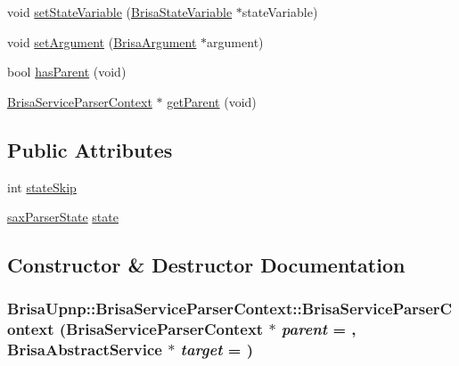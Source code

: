 \begin{DoxyCompactItemize}
void \hyperlink{classBrisaUpnp_1_1BrisaServiceParserContext_a06e08c8c57ac4bce5762e9b464f925e9}{setStateVariable} (\hyperlink{classBrisaUpnp_1_1BrisaStateVariable}{BrisaStateVariable} $\ast$stateVariable)
\item 
void \hyperlink{classBrisaUpnp_1_1BrisaServiceParserContext_af831b6197718043243829205aac8bdae}{setArgument} (\hyperlink{classBrisaUpnp_1_1BrisaArgument}{BrisaArgument} $\ast$argument)
\item 
bool \hyperlink{classBrisaUpnp_1_1BrisaServiceParserContext_ac1dcc34e13525285d80d8a0a845dea07}{hasParent} (void)
\item 
\hyperlink{classBrisaUpnp_1_1BrisaServiceParserContext}{BrisaServiceParserContext} $\ast$ \hyperlink{classBrisaUpnp_1_1BrisaServiceParserContext_a1f8f19cd9e7a5708495bb30ddce78508}{getParent} (void)
\end{DoxyCompactItemize}
\subsection*{Public Attributes}
\begin{DoxyCompactItemize}
\item 
int \hyperlink{classBrisaUpnp_1_1BrisaServiceParserContext_a8984b0f15ccfd72eeaf72ce8219ea0b0}{stateSkip}
\item 
\hyperlink{namespaceBrisaUpnp_aa5330e842f464b5365633a03ea39a9c8}{saxParserState} \hyperlink{classBrisaUpnp_1_1BrisaServiceParserContext_a0268f1aa5844e3e06ecbc7ab45903647}{state}
\end{DoxyCompactItemize}


\subsection{Constructor \& Destructor Documentation}
\hypertarget{classBrisaUpnp_1_1BrisaServiceParserContext_afb4df40bd858897abdd2c9a79f524486}{
\subsubsection[{BrisaServiceParserContext}]{\setlength{\rightskip}{0pt plus 5cm}BrisaUpnp::BrisaServiceParserContext::BrisaServiceParserContext ({\bf BrisaServiceParserContext} $\ast$ {\em parent} = {}, \/  {\bf BrisaAbstractService} $\ast$ {\em target} = {})}}
\label{classBrisaUpnp_1_1BrisaServiceParserContext_afb4df40bd858897abdd2c9a79f524486}


